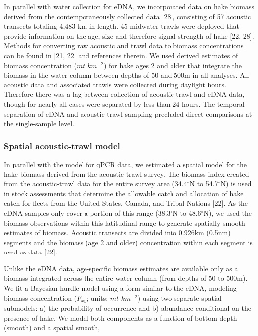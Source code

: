 \documentclass[
]{article}
\begin{document}
In parallel with water collection for eDNA, we incorporated data on hake
biomass derived from the contemporaneously collected data
{[}28{]}, consisting of 57 acoustic transects totaling 4,483 km in length. 45
midwater trawls were deployed that provide information on the age, size
and therefore signal strength of hake  {[}22, 28{]}. Methods for converting
raw acoustic and trawl data to biomass concentrations can be found in
{[}21, 22{]} and references therein. We used derived estimates of biomass
concentration (\(mt\) \(km^{-2}\)) for hake ages 2 and older that
integrate the biomass in the water column between depths of 50 and 500m
in all analyses. All acoustic data and associated trawls were collected
during daylight hours. Therefore there was a lag between collection of
acoustic-trawl and eDNA data, though for nearly all cases were
separated by less than 24 hours. The temporal separation of eDNA and
acoustic-trawl sampling precluded direct comparisons at the single-sample
level.

\hypertarget{spatial-acoustic-trawl-model}{%
\subsubsection{Spatial acoustic-trawl
model}\label{spatial-acoustic-trawl-model}}

In parallel with the model for qPCR data, we estimated a spatial model
for the hake biomass derived from the acoustic-trawl survey. The biomass
index created from the acoustic-trawl data for the entire survey area
(34.4\(^{\circ}\)N to 54.7\(^{\circ}\)N) is used in stock assessments
that determine the allowable catch and allocation of hake catch for
fleets from the United States, Canada, and Tribal Nations {[}22{]}. As the
eDNA samples only cover a portion of this range (38.3\(^{\circ}\)N to
48.6\(^{\circ}\)N), we used the biomass observations within this
latitudinal range to generate spatially smooth estimates of biomass.
Acoustic transects are divided into 0.926km (0.5nm) segments and the
biomass (age 2 and older) concentration within each segment is used as
data {[}22{]}.

Unlike the eDNA data, age-specific biomass estimates are available only
as a biomass integrated across the entire water column (from depths of
50 to 500m). We fit a Bayesian hurdle model using a form similar to the
eDNA, modeling biomass concentration (\(F_{xy}\); units: \(mt\)
\(km^{-2}\)) using two separate spatial submodels: a) the probability of
occurrence and b) abundance conditional on the presence of hake. We
model both components as a function of bottom depth (smooth) and a
spatial smooth,
\end{document}
